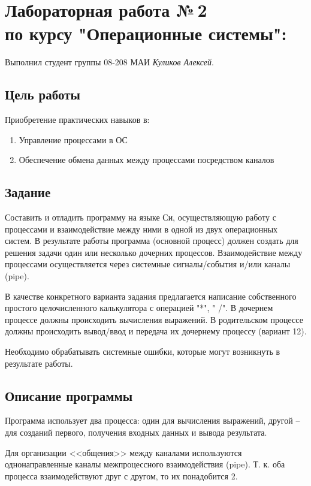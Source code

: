 \documentclass[12pt]{article}
\begin{document}
\section*{Лабораторная работа №\,2 \\ по курсу "Операционные системы": }

Выполнил студент группы 08-208 МАИ \textit{Куликов Алексей}.

\subsection*{Цель работы}
Приобретение практических навыков в:
 
\begin{enumerate}
\item  Управление процессами в ОС
\item  Обеспечение обмена данных между процессами посредством каналов
\end{enumerate}

\subsection*{Задание}

Составить и отладить программу на языке Си, осуществляющую работу с процессами и взаимодействие между ними в одной из двух операционных систем. В результате работы программа (основной процесс) должен создать для решения задачи один или несколько дочерних процессов. Взаимодействие между процессами осуществляется через системные сигналы/события и/или каналы (pipe).

В качестве конкретного варианта задания предлагается написание собственного простого целочисленного калькулятора с операцией  "*", " /". В дочернем процессе должны происходить вычисления выражений. В родительском процессе должны происходить вывод/ввод и передача их дочернему процессу (вариант 12).

Необходимо обрабатывать системные ошибки, которые могут возникнуть в результате работы.

\subsection*{Описание программы}

Программа использует два процесса: один для вычисления выражений, другой -- для созданий первого, получения входных данных и вывода результата.

Для организации <<общения>> между каналами используются однонаправленные каналы межпроцессного взаимодействия (pipe). Т. к. оба процесса взаимодействуют друг с другом, то их понадобится 2.
\end{document}
